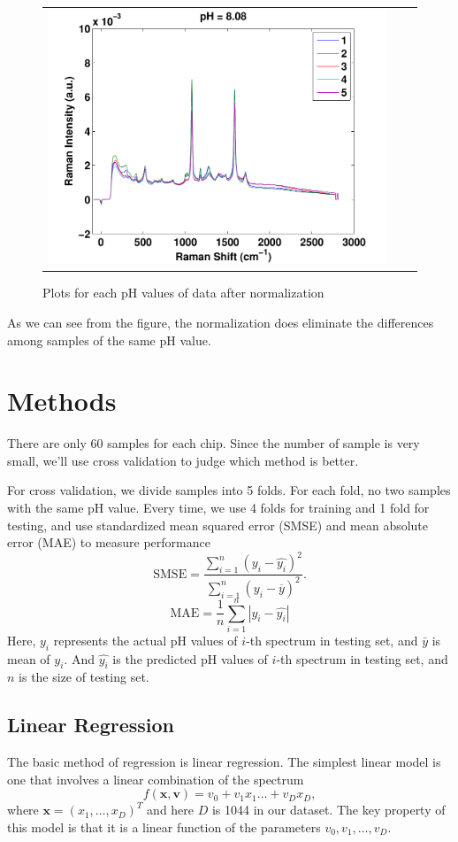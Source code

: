 \documentclass[a4paper]{article}
\newcommand{\bfv}{\mathbf{v}}
\newcommand{\bfx}{\mathbf{x}}
\begin{document}
\begin{figure}[h]
\begin{tabular}{ccc}
\includegraphics[width=.33\textwidth]{images/n12.pdf} \\
\end{tabular}
\caption{Plots for each pH values of data after normalization}\label{pic3}
\end{figure}

As we can see from the figure, the normalization does eliminate the differences among samples of the same pH value.
\section{Methods}
There are only 60 samples for each chip. Since the number of sample is very small, we'll use cross validation to judge which method is better.

For cross validation, we divide samples into 5 folds. For each fold, no two samples with the same pH value. Every time, we use 4 folds for training and 1 fold for testing, and use standardized mean squared error (SMSE) and mean absolute error (MAE) to measure performance%
\begin{equation}
\mathrm{SMSE}=\frac{\displaystyle \sum_{i=1}^n (y_i-\hat{y_i})^2}{\displaystyle \sum_{i=1}^n (y_i-\overline{y})^2}.
\end{equation}
\begin{equation}
\mathrm{MAE}=\frac{1}{n} \sum_{i=1}^n |y_i - \hat{y_i}|
\end{equation}
Here, $y_i$ represents the actual pH values of $i$-th spectrum in testing set, and $\bar{y}$ is mean of $y_i$. And $\hat{y_i}$ is the predicted pH values of $i$-th spectrum in testing set, and $n$ is the size of testing set.
\subsection{Linear Regression}
The basic method of regression is linear regression. The simplest linear model is one that involves a linear combination of the spectrum
\begin{equation}
f(\bfx,\bfv)=v_0+v_1x_1\ldots+v_Dx_D,
\end{equation}
where $\bfx=(x_1,\ldots,x_D)^T$ and here $D$ is 1044 in our dataset. The key property of this model is that it is a linear function of the parameters $v_0,v_1,\ldots,v_D$. 
\end{document}
